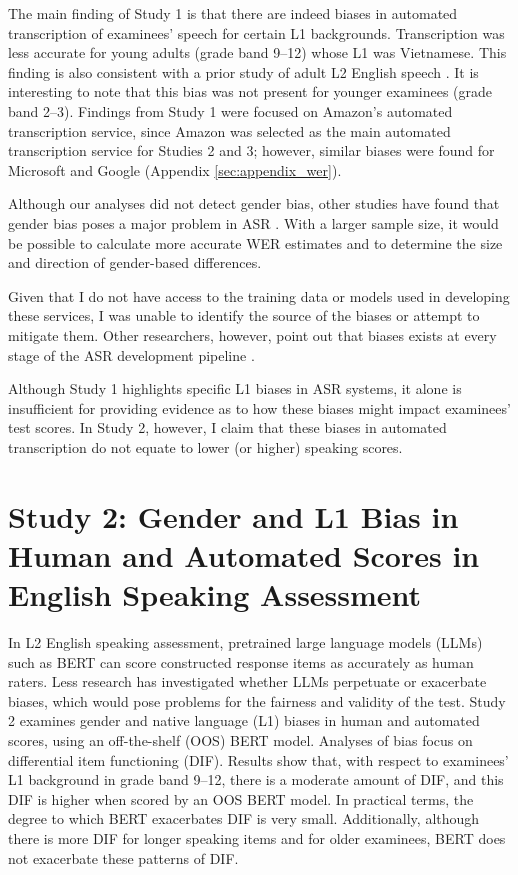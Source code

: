 \documentclass [PhD] {uclathes}
\begin{document}
The main finding of Study 1 is that there are indeed biases in automated transcription of examinees’ speech for certain L1 backgrounds. Transcription was less accurate for young adults (grade band 9–12) whose L1 was Vietnamese. This finding is also consistent with a prior study of adult L2 English speech \citep{chan2022training}. It is interesting to note that this bias was not present for younger examinees (grade band 2–3). Findings from Study 1 were focused on Amazon’s automated transcription service, since Amazon was selected as the main automated transcription service for Studies 2 and 3; however, similar biases were found for Microsoft and Google (Appendix \ref{sec:appendix_wer}). 

Although our analyses did not detect gender bias, other studies have found that gender bias poses a major problem in ASR \citep{hutiri2022}. With a larger sample size, it would be possible to calculate more accurate WER estimates and to determine the size and direction of gender-based differences. 

Given that I do not have access to the training data or models used in developing these services, I was unable to identify the source of the biases or attempt to mitigate them. Other researchers, however, point out that biases exists at every stage of the ASR development pipeline \citep{hutiri2022, suresh2021framework}.

Although Study 1 highlights specific L1 biases in ASR systems, it alone is insufficient for providing evidence as to how these biases might impact examinees' test scores. In Study 2, however, I claim that these biases in automated transcription do not equate to lower (or higher) speaking scores.



\chapter{Study 2: Gender and L1 Bias in Human and Automated Scores in English Speaking Assessment}
\label{study2}

In L2 English speaking assessment, pretrained large language models (LLMs) such as BERT can score constructed response items as accurately as human raters. Less research has investigated whether LLMs perpetuate or exacerbate biases, which would pose problems for the fairness and validity of the test. Study 2 examines gender and native language (L1) biases in human and automated scores, using an off-the-shelf (OOS) BERT model. Analyses of bias focus on differential item functioning (DIF). Results show that, with respect to examinees’ L1 background in grade band 9–12, there is a moderate amount of DIF, and this DIF is higher when scored by an OOS BERT model. In practical terms, the degree to which BERT exacerbates DIF is very small. Additionally, although there is more DIF for longer speaking items and for older examinees, BERT does not exacerbate these patterns of DIF. 
\end{document}
